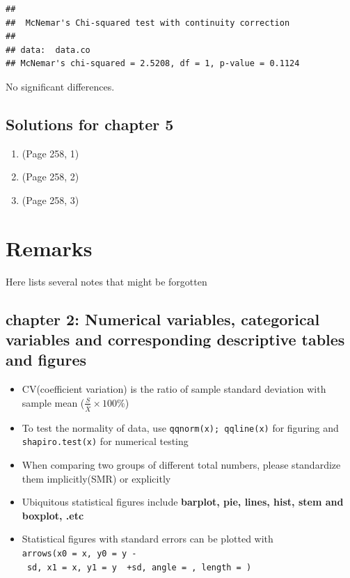 \documentclass{article}
\begin{document}
\begin{verbatim}
## 
##  McNemar's Chi-squared test with continuity correction
## 
## data:  data.co
## McNemar's chi-squared = 2.5208, df = 1, p-value = 0.1124
\end{verbatim}

No significant differences.

\hypertarget{solutions-for-chapter-5}{%
\subsection{Solutions for chapter 5}\label{solutions-for-chapter-5}}

\begin{enumerate}
\def\labelenumi{\arabic{enumi}.}
\item
  (Page 258, 1)
\item
  (Page 258, 2)
\item
  (Page 258, 3)
\end{enumerate}

\newpage

\hypertarget{remarks}{%
\section{Remarks}\label{remarks}}

Here lists several notes that might be forgotten

\hypertarget{chapter-2-numerical-variables-categorical-variables-and-corresponding-descriptive-tables-and-figures}{%
\subsection{chapter 2: Numerical variables, categorical variables and
corresponding descriptive tables and
figures}\label{chapter-2-numerical-variables-categorical-variables-and-corresponding-descriptive-tables-and-figures}}

\begin{itemize}
\tightlist
\item
  CV(coefficient variation) is the ratio of sample standard deviation
  with sample mean (\(\frac{S}{\bar{X}}\times 100\%\))
\item
  To test the normality of data, use \texttt{qqnorm(x);\ qqline(x)} for
  figuring and \texttt{shapiro.test(x)} for numerical testing
\item
  When comparing two groups of different total numbers, please
  standardize them implicitly(SMR) or explicitly
\item
  Ubiquitous statistical figures include
  \textbf{barplot, pie, lines, hist, stem and boxplot, .etc}
\item
  Statistical figures with standard errors can be plotted with
  \texttt{arrows(x0\ =\ x,\ y0\ =\ y\ -\ sd,\ x1\ =\ x,\ y1\ =\ y\ \ +sd,\ angle\ =\ ,\ length\ =\ )}
\end{itemize}
\end{document}
